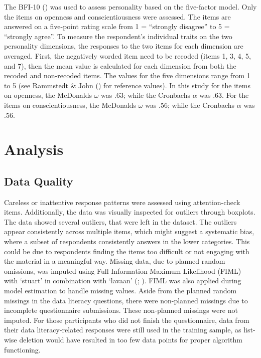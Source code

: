 \documentclass[
  12pt,
  a4paper,
  twoside]{article}
\begin{document}
The BFI-10 () was used to assess personality based on the five-factor model.
Only the items on openness and conscientiousness were assessed.
The items are answered on a five-point rating scale from 1 = ``strongly disagree'' to 5 = ``strongly agree''.
To measure the respondent's individual traits on the two personality dimensions, the responses to the two items for each dimension are averaged.
First, the negatively worded item need to be recoded (items 1, 3, 4, 5, and 7), then the mean value is calculated for each dimension from both the recoded and non-recoded items.
The values for the five dimensions range from 1 to 5 (see Rammstedt \& John () for reference values).
In this study for the items on openness, the McDonalds \(\omega\) was .63; while the Cronbachs \(\alpha\) was .63.
For the items on conscientiousness, the McDonalds \(\omega\) was .56; while the Cronbachs \(\alpha\) was .56.

\section{Analysis}\label{analysis}

\subsection{Data Quality}\label{data-quality}

Careless or inattentive response patterns were assessed using attention-check items. Additionally, the data was visually inspected for outliers through boxplots. The data showed several outliers, that were left in the dataset. The outliers appear consistently across multiple items, which might suggest a systematic bias, where a subset of respondents consistently answers in the lower categories. This could be due to respondents finding the items too difficult or not engaging with the material in a meaningful way. Missing data, due to planned random omissions, was imputed using Full Information Maximum Likelihood (FIML) with `stuart' in combination with `lavaan' (; ). FIML was also applied during model estimation to handle missing values. Aside from the planned random missings in the data literacy questions, there were non-planned missings due to incomplete questionnaire submissions. These non-planned missings were not imputed. For those participants who did not finish the questionnaire, data from their data literacy-related responses were still used in the training sample, as list-wise deletion would have resulted in too few data points for proper algorithm functioning.
\end{document}
